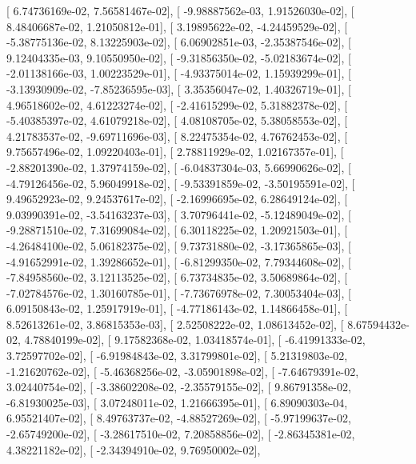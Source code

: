 \documentclass{article}
\begin{document}
       [  6.74736169e-02,   7.56581467e-02],
       [ -9.98887562e-03,   1.91526030e-02],
       [  8.48406687e-02,   1.21050812e-01],
       [  3.19895622e-02,  -4.24459529e-02],
       [ -5.38775136e-02,   8.13225903e-02],
       [  6.06902851e-03,  -2.35387546e-02],
       [  9.12404335e-03,   9.10550950e-02],
       [ -9.31856350e-02,  -5.02183674e-02],
       [ -2.01138166e-03,   1.00223529e-01],
       [ -4.93375014e-02,   1.15939299e-01],
       [ -3.13930909e-02,  -7.85236595e-03],
       [  3.35356047e-02,   1.40326719e-01],
       [  4.96518602e-02,   4.61223274e-02],
       [ -2.41615299e-02,   5.31882378e-02],
       [ -5.40385397e-02,   4.61079218e-02],
       [  4.08108705e-02,   5.38058553e-02],
       [  4.21783537e-02,  -9.69711696e-03],
       [  8.22475354e-02,   4.76762453e-02],
       [  9.75657496e-02,   1.09220403e-01],
       [  2.78811929e-02,   1.02167357e-01],
       [ -2.88201390e-02,   1.37974159e-02],
       [ -6.04837304e-03,   5.66990626e-02],
       [ -4.79126456e-02,   5.96049918e-02],
       [ -9.53391859e-02,  -3.50195591e-02],
       [  9.49652923e-02,   9.24537617e-02],
       [ -2.16996695e-02,   6.28649124e-02],
       [  9.03990391e-02,  -3.54163237e-03],
       [  3.70796441e-02,  -5.12489049e-02],
       [ -9.28871510e-02,   7.31699084e-02],
       [  6.30118225e-02,   1.20921503e-01],
       [ -4.26484100e-02,   5.06182375e-02],
       [  9.73731880e-02,  -3.17365865e-03],
       [ -4.91652991e-02,   1.39286652e-01],
       [ -6.81299350e-02,   7.79344608e-02],
       [ -7.84958560e-02,   3.12113525e-02],
       [  6.73734835e-02,   3.50689864e-02],
       [ -7.02784576e-02,   1.30160785e-01],
       [ -7.73676978e-02,   7.30053404e-03],
       [  6.09150843e-02,   1.25917919e-01],
       [ -4.77186143e-02,   1.14866458e-01],
       [  8.52613261e-02,   3.86815353e-03],
       [  2.52508222e-02,   1.08613452e-02],
       [  8.67594432e-02,   4.78840199e-02],
       [  9.17582368e-02,   1.03418574e-01],
       [ -6.41991333e-02,   3.72597702e-02],
       [ -6.91984843e-02,   3.31799801e-02],
       [  5.21319803e-02,  -1.21620762e-02],
       [ -5.46368256e-02,  -3.05901898e-02],
       [ -7.64679391e-02,   3.02440754e-02],
       [ -3.38602208e-02,  -2.35579155e-02],
       [  9.86791358e-02,  -6.81930025e-03],
       [  3.07248011e-02,   1.21666395e-01],
       [  6.89090303e-04,   6.95521407e-02],
       [  8.49763737e-02,  -4.88527269e-02],
       [ -5.97199637e-02,  -2.65749200e-02],
       [ -3.28617510e-02,   7.20858856e-02],
       [ -2.86345381e-02,   4.38221182e-02],
       [ -2.34394910e-02,   9.76950002e-02],
\end{document}
